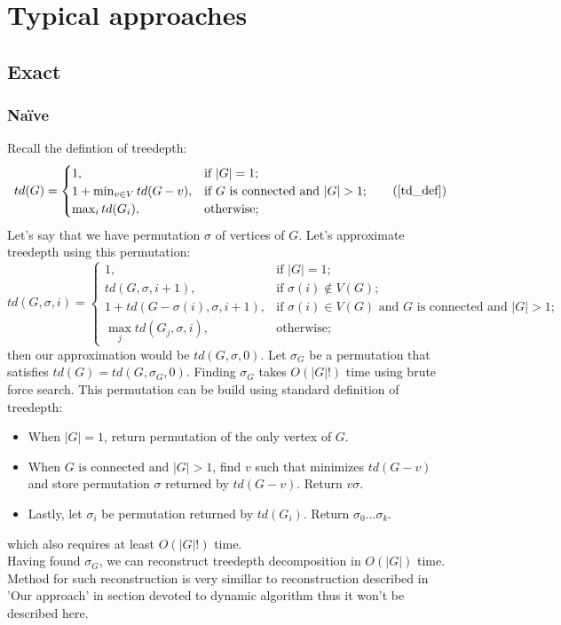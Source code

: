 \section{Typical approaches}
\subsection{Exact}
\subsubsection{Na\"ive}
Recall the defintion of treedepth:
\begin{equation*}
td(G)={\begin{cases}1,&{\text{if }}|G|=1;\\1+\min _{{v\in V}}td(G-v),&{\text{if }}G{\text{ is connected and }}|G|>1;\\\max _{{i}}td(G_{i}),&{\text{otherwise}};\end{cases}}\tag{\ref{td_def}}
\end{equation*}
Let's say that we have permutation $\sigma$ of vertices of $G$. Let's approximate treedepth using this permutation:
\begin{equation}
td(G, \sigma, i)={
	\begin{cases}
	1,&{\text{if }}|G|=1;\\
	td(G, \sigma, i + 1), &{\text{if }}\sigma(i)\notin V(G);\\
	1+td(G-\sigma(i), \sigma, i+1),&{\text{if }}{\sigma(i)\in V(G)\text{ and }}G{\text{ is connected and }}|G|>1;\\
	\max _{{j}}td(G_{j}, \sigma, i),&{\text{otherwise}};
	\end{cases}
}
\end{equation}
then our approximation would be $td(G, \sigma, 0)$. Let $\sigma_G$ be a permutation that satisfies $td(G) = td(G, \sigma_G, 0)$. Finding $\sigma_G$ takes $O\left(\left|G\right|!\right)$ time using brute force search. This permutation can be build using standard definition of treedepth:
\begin{itemize}
	\item When $\left|G\right| = 1$, return permutation of the only vertex of $G$.
	\item When $G{\text{ is connected and }}|G|>1$, find $v$ such that minimizes $td(G-v)$ and store permutation $\sigma$ returned by $td(G-v)$. Return $v\sigma$.
	\item Lastly, let $\sigma_i$ be permutation returned by $td(G_i)$. Return $\sigma_0...\sigma_k$.
\end{itemize}
which also requires at least $O\left(\left|G\right|!\right)$ time.\\
Having found $\sigma_G$, we can reconstruct treedepth decomposition in $O\left(\left|G\right|\right)$ time. Method for such reconstruction is very simillar to reconstruction described in 'Our approach' in section devoted to dynamic algorithm thus it won't be described here.
